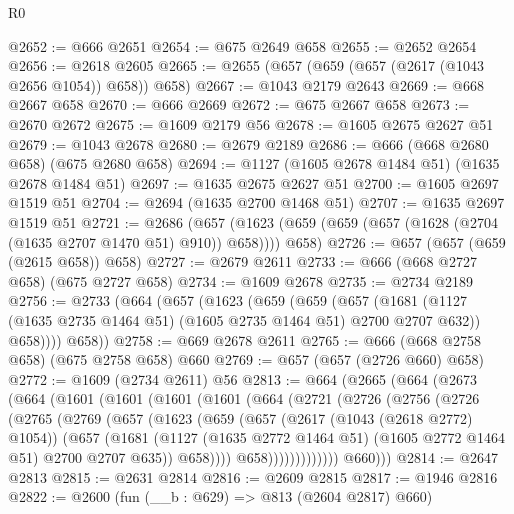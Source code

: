 \begin{lexlean}{R0}
\begin{coremodule}
@2652 := @666 @2651
@2654 := @675 @2649 @658
@2655 := @2652 @2654
@2656 := @2618 @2605
@2665 := @2655 (@657 (@659 (@657 (@2617 (@1043 @2656 @1054)) @658)) @658)
@2667 := @1043 @2179 @2643
@2669 := @668 @2667 @658
@2670 := @666 @2669
@2672 := @675 @2667 @658
@2673 := @2670 @2672
@2675 := @1609 @2179 @56
@2678 := @1605 @2675 @2627 @51
@2679 := @1043 @2678
@2680 := @2679 @2189
@2686 := @666 (@668 @2680 @658) (@675 @2680 @658)
@2694 := @1127 (@1605 @2678 @1484 @51) (@1635 @2678 @1484 @51)
@2697 := @1635 @2675 @2627 @51
@2700 := @1605 @2697 @1519 @51
@2704 := @2694 (@1635 @2700 @1468 @51)
@2707 := @1635 @2697 @1519 @51
@2721 := @2686
    (@657 (@1623 (@659 (@659 (@657 (@1628 (@2704 (@1635 @2707 @1470 @51) @910)) @658)))) @658)
@2726 := @657 (@657 (@659 (@2615 @658)) @658)
@2727 := @2679 @2611
@2733 := @666 (@668 @2727 @658) (@675 @2727 @658)
@2734 := @1609 @2678
@2735 := @2734 @2189
@2756 := @2733
    (@664
      (@657
        (@1623
          (@659
            (@659
              (@657
                (@1681 (@1127 (@1635 @2735 @1464 @51) (@1605 @2735 @1464 @51) @2700 @2707 @632))
                @658))))
        @658))
@2758 := @669 @2678 @2611
@2765 := @666 (@668 @2758 @658) (@675 @2758 @658) @660
@2769 := @657 (@657 (@2726 @660) @658)
@2772 := @1609 (@2734 @2611) @56
@2813 := @664
    (@2665
      (@664
        (@2673
          (@664
            (@1601
              (@1601
                (@1601
                  (@1601
                    (@664
                      (@2721
                        (@2726
                          (@2756
                            (@2726
                              (@2765
                                (@2769
                                  (@657
                                    (@1623
                                      (@659
                                        (@657
                                          (@2617 (@1043 (@2618 @2772) @1054))
                                          (@657
                                            (@1681
                                              (@1127
                                                (@1635 @2772 @1464 @51)
                                                (@1605 @2772 @1464 @51)
                                                @2700
                                                @2707
                                                @635))
                                            @658))))
                                    @658)))))))))))))
          @660)))
@2814 := @2647 @2813
@2815 := @2631 @2814
@2816 := @2609 @2815
@2817 := @1946 @2816
@2822 := @2600 (fun (__b : @629) => @813 (@2604 @2817) @660)

\end{coremodule}
\end{lexlean}
